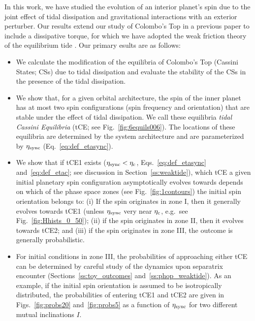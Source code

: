 \documentclass[
        fleqn,
        usenatbib,
        referee,
    ]{mnras}
\begin{document}
In this work, we have studied the evolution of an interior planet's spin due to
the joint effect of tidal dissipation and gravitational interactions with an
exterior perturber. Our results extend our study of Colombo's Top in a previous
paper \citep{su2020} to include a dissipative torque, for which we have adopted
the weak friction theory of the equilibrium tide \citep{lai2012}. Our primary
esults are as follows:
\begin{itemize}
    \item We calculate the modification of the equilibria of Colombo's Top
        (Cassini States; CSs) due to tidal dissipation and evaluate the
        stability of the CSs in the presence of the tidal dissipation.

    \item We show that, for a given orbital architecture, the spin of the inner
        planet has at most two spin configurations (spin frequency and
        orientation) that are stable under the effect of tidal dissipation. We
        call these equilibria \emph{tidal Cassini Equilibria} (tCE\@; see
        Fig.~\ref{fig:6equils006}). The locations of these equilibria are
        determined by the system architecture and are parameterized by
        $\eta_{\rm sync}$ (Eq.~\ref{eq:def_etasync}).

    \item We show that if tCE1 exists ($\eta_{\rm sync} < \eta_{\rm c}$,
        Eqs.~\ref{eq:def_etasync} and~\ref{eq:def_etac}; see discussion in
        Section~\ref{ss:weaktide}), which tCE a given initial planetary spin
        configuration asymptotically evolves towards depends on which of the
        phase space zones (see Fig.~\ref{fig:1contours}) the initial spin
        orientation belongs to: (i) If the spin originates in zone I, then it
        generally evolves towards tCE1 (unless $\eta_{\rm sync}$ very near
        $\eta_{\rm c}$, e.g.\ see Fig.~\ref{fig:Hhists_0_50}); (ii) if the spin
        originates in zone II, then it evolves towards tCE2; and (iii) if the
        spin originates in zone III, the outcome is generally probabilistic.

    \item For initial conditions in zone III, the probabilities of approaching
        either tCE can be determined by careful study of the dynamics upon
        separatrix encounter (Sections~\ref{ss:toy_outcomes}
        and~\ref{ss:phop_weaktide}). As an example, if the initial spin
        orientation is assumed to be isotropically distributed, the
        probabilities of entering tCE1 and tCE2 are given in
        Figs.~\ref{fig:probs20} and~\ref{fig:probs5} as a function of $\eta_{\rm
        sync}$ for two different mutual inclinations $I$.


\end{itemize}
\end{document}
